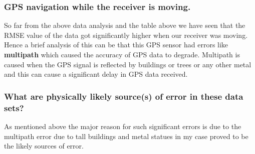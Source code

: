 \documentclass[a4paper]{article}
\begin{document}
\subsubsection{GPS navigation while the receiver is moving.}
So far from the above data analysis and the table above we have seen that the RMSE value of the data got significantly higher when our receiver was moving. Hence a brief analysis of this can be that this GPS sensor had errors like \textbf{multipath} which caused the accuracy of GPS data to degrade. Multipath is caused when the GPS signal is reflected by buildings or trees or any other metal and this can cause a significant delay in GPS data received.
\subsubsection{What are physically likely source(s) of error in these data sets?}
As mentioned above the major reason for such significant errors is due to the multipath error due to tall buildings and metal statues in my case proved to be the likely sources of error.
\end{document}
